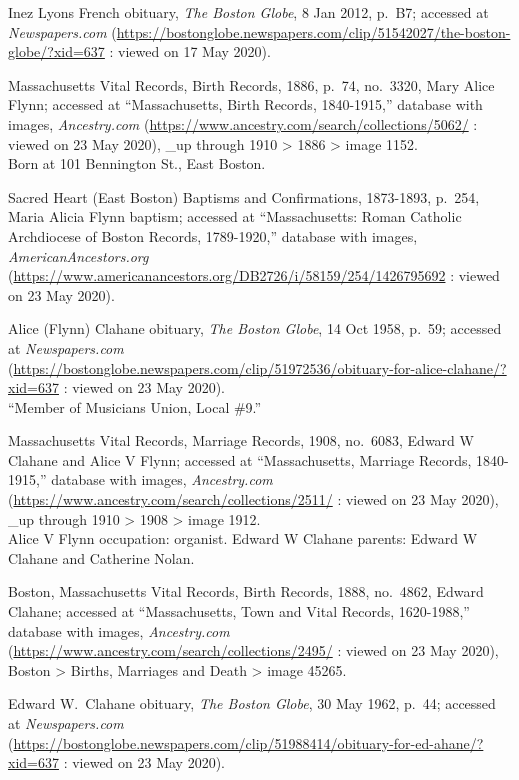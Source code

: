 \begin{thebibliography}{999}
	Inez Lyons French obituary, \textit{The Boston Globe}, 8 Jan 2012, p.\ B7; accessed at \textit{Newspapers.com} (\url{https://bostonglobe.newspapers.com/clip/51542027/the-boston-globe/?xid=637} : viewed on 17 May 2020).
	
	Massachusetts Vital Records, Birth Records, 1886, p.\ 74, no.\ 3320, Mary Alice Flynn; accessed at ``Massachusetts, Birth Records, 1840-1915,'' database with images, \textit{Ancestry.com} (\url{https://www.ancestry.com/search/collections/5062/} : viewed on 23 May 2020), \_up through 1910 > 1886 > image 1152.\\
	Born at 101 Bennington St., East Boston.
	
	Sacred Heart (East Boston) Baptisms and Confirmations, 1873-1893, p.\ 254, Maria Alicia Flynn baptism; accessed at ``Massachusetts: Roman Catholic Archdiocese of Boston Records, 1789-1920,'' database with images, \textit{AmericanAncestors.org} (\url{https://www.americanancestors.org/DB2726/i/58159/254/1426795692} : viewed on 23 May 2020).
	
	Alice (Flynn) Clahane obituary, \textit{The Boston Globe}, 14 Oct 1958, p.\ 59; accessed at \textit{Newspapers.com} (\url{https://bostonglobe.newspapers.com/clip/51972536/obituary-for-alice-clahane/?xid=637} : viewed on 23 May 2020).\\
	``Member of Musicians Union, Local \#9.''
	
	Massachusetts Vital Records, Marriage Records, 1908, no.\ 6083, Edward W Clahane and Alice V Flynn; accessed at ``Massachusetts, Marriage Records, 1840-1915,'' database with images, \textit{Ancestry.com} (\url{https://www.ancestry.com/search/collections/2511/} : viewed on 23 May 2020), \_up through 1910 > 1908 > image 1912.\\
	Alice V Flynn occupation: organist. Edward W Clahane parents: Edward W Clahane and Catherine Nolan.
	
	Boston, Massachusetts Vital Records, Birth Records, 1888, no.\ 4862, Edward Clahane; accessed at ``Massachusetts, Town and Vital Records, 1620-1988,'' database with images, \textit{Ancestry.com} (\url{https://www.ancestry.com/search/collections/2495/} : viewed on 23 May 2020), Boston > Births, Marriages and Death > image 45265.
	
	Edward W.\ Clahane obituary, \textit{The Boston Globe}, 30 May 1962, p.\ 44; accessed at \textit{Newspapers.com} (\url{https://bostonglobe.newspapers.com/clip/51988414/obituary-for-ed-ahane/?xid=637} : viewed on 23 May 2020).
	

\end{thebibliography}
